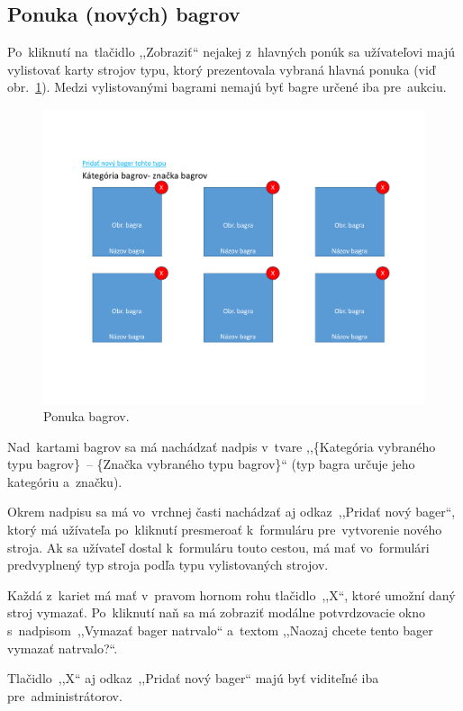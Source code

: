 \subsection{Ponuka (nových) bagrov}

Po~kliknutí na~tlačidlo ,,Zobraziť`` nejakej z~hlavných ponúk sa užívateľovi majú vylistovať karty strojov typu, ktorý prezentovala vybraná hlavná ponuka (viď obr.~\ref{excavator cards}). Medzi vylistovanými bagrami nemajú byť bagre určené iba pre~aukciu.

\begin{figure}[H]\centering
\includegraphics[width=140mm]{../img/UI concept/excavator cards}
\caption{Ponuka bagrov.}
\label{excavator cards}
\end{figure}

Nad~kartami bagrov sa má nachádzať nadpis v~tvare ,,\{Kategória vybraného typu bagrov\}~-- \{Značka vybraného typu bagrov\}`` (typ bagra určuje jeho kategóriu a~značku).

Okrem nadpisu sa má vo~vrchnej časti nachádzať aj odkaz~,,Pridať nový bager``, ktorý má užívateľa po~kliknutí presmeroať k~formuláru pre~vytvorenie nového stroja. Ak sa užívateľ dostal k~formuláru touto cestou, má mať vo~formulári predvyplnený typ stroja podľa typu vylistovaných strojov.

Každá z~kariet má mať v~pravom hornom rohu tlačidlo~,,X``, ktoré umožní daný stroj vymazať. Po~kliknutí naň sa má zobraziť modálne potvrdzovacie okno s~nadpisom~,,Vymazať bager natrvalo`` a~textom ,,Naozaj chcete tento bager vymazať natrvalo?``.

Tlačidlo~,,X`` aj odkaz~,,Pridať nový bager`` majú byť viditeľné iba pre~administrátorov.

